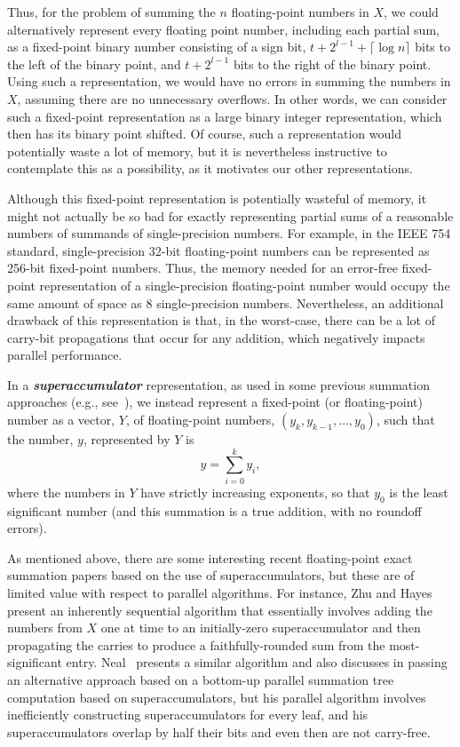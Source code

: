 \documentclass[11pt]{article}
\renewcommand{\emph}[1]{\textit{\textbf{#1}}}
\begin{document}
Thus, for the problem of summing the $n$ floating-point numbers in $X$,
we could alternatively represent every floating point number, including
each partial sum, as a
fixed-point binary number consisting of a sign bit, 
$t+2^{l-1}+\lceil\log n\rceil$ 
bits to the left of the binary point, and $t+2^{l-1}$ bits to the right of
the binary point.
Using such a representation, 
we would have
no errors in summing the numbers in $X$, assuming
there are no unnecessary overflows.
In other words,
we can consider such a fixed-point representation
as a large binary integer
representation, which then has its binary point shifted.
Of course, such a representation would potentially waste a lot of 
memory,
but it is nevertheless instructive to contemplate this as a possibility,
as it motivates our other representations.

Although this fixed-point representation is potentially wasteful of memory, 
it might not actually be so bad for exactly 
representing partial sums of a reasonable numbers of summands of 
single-precision numbers.
For example, in the IEEE 754 standard, single-precision 32-bit
floating-point numbers can be represented as 256-bit fixed-point 
numbers.
Thus, 
the memory needed for an error-free fixed-point representation of
a single-precision floating-point number would
occupy the same amount of space as 8 single-precision numbers.
Nevertheless,
an additional drawback of this representation is that, in the
worst-case, there can be a lot of carry-bit propagations that occur for any
addition, which negatively impacts parallel performance.

In a \emph{superaccumulator} 
representation, as used in some previous summation 
approaches
(e.g., see~\cite{doi:10.1137/1028001,Neal15a,p145549,shewchuk,Zhu:2010:A9O}),
we instead represent a fixed-point (or floating-point) 
number as a vector, $Y$, of 
floating-point numbers, $(y_k,y_{k-1},\ldots,y_0)$, 
such that the number, $y$, represented by $Y$ is
\[
y = \sum_{i=0}^k y_i,
\]
where the numbers in $Y$ have strictly increasing exponents, 
so that $y_0$ is the
least significant number (and this summation is a true addition, with no
roundoff errors).


As mentioned above,
there are some interesting recent floating-point exact summation papers based
on the use of superaccumulators, but these are of limited value with respect
to parallel algorithms.
For instance, Zhu and Hayes~\cite{Zhu:2010:A9O}
present an inherently sequential algorithm that essentially involves 
adding the numbers from $X$ one at time to an initially-zero
superaccumulator and then propagating the carries to produce a
faithfully-rounded sum from the most-significant entry.
Neal~\cite{Neal15a} presents a similar algorithm and also
discusses in passing an alternative approach based on a bottom-up
parallel summation tree computation based on superaccumulators, 
but his parallel algorithm involves 
inefficiently constructing superaccumulators for every leaf, and his
superaccumulators overlap by half their bits and even then are not
carry-free.
\end{document}
